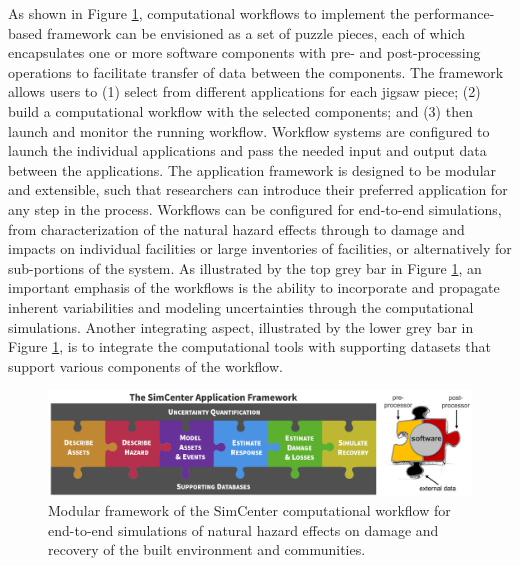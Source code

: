 As shown in Figure \ref{fig:intro_SimCenter_framework}, computational workflows to implement the performance-based framework can be envisioned as a set of puzzle pieces, each of which encapsulates one or more software components with pre- and post-processing operations to facilitate transfer of data between the components.  The framework allows users to (1) select from different applications for each jigsaw piece; (2) build a computational workflow with the selected components; and (3) then launch and monitor the running workflow. Workflow systems are configured to launch the individual applications and pass the needed input and output data between the applications.  The application framework is designed to be modular and extensible, such that researchers can introduce their preferred application for any step in the process.  Workflows can be configured for end-to-end simulations, from characterization of the natural hazard effects through to damage and impacts on individual facilities or large inventories of facilities, or alternatively for sub-portions of the system.  As illustrated by the top grey bar in Figure \ref{fig:intro_SimCenter_framework}, an important emphasis of the workflows is the ability to incorporate and propagate inherent variabilities and modeling uncertainties through the computational simulations. Another integrating aspect, illustrated by the lower grey bar in Figure \ref{fig:intro_SimCenter_framework}, is to integrate the computational tools with supporting datasets that support various components of the workflow. 

\begin{figure}[htb]
    \centering
    \includegraphics[width=1.0\textwidth, angle = 0]{Figures/SimCenter_framework.pdf}
    \caption{Modular framework of the SimCenter computational workflow for end-to-end simulations of natural hazard effects on damage and recovery of the built environment and communities.}
    \label{fig:intro_SimCenter_framework}
\end{figure}

